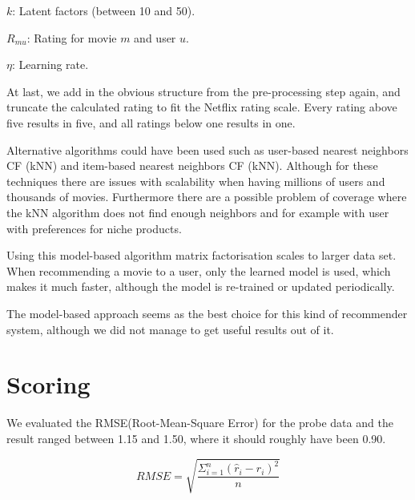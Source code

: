 	\begin{description}
		\item $k$: Latent factors (between 10 and 50).
		\item $R_{mu}$: Rating for movie $m$ and user $u$.
		\item $\eta$: Learning rate.
	\end{description}
	
	At last, we add in the obvious structure from the pre-processing step again, and truncate the calculated rating to fit the Netflix rating scale. Every rating above five results in five, and all ratings below one results in one.
	
	Alternative algorithms could have been used such as user-based nearest neighbors CF (kNN) and item-based nearest neighbors CF (kNN). Although for these techniques there are issues with scalability when having millions of users and thousands of movies. Furthermore there are a possible problem of coverage where the kNN algorithm does not find enough neighbors and for example with user with preferences for niche products.
	
	Using this model-based algorithm matrix factorisation scales to larger data set. When recommending a movie to a user, only the learned model is used, which makes it much faster, although the model is re-trained or updated periodically.
	
	The model-based approach seems as the best choice for this kind of recommender system, although we did not manage to get useful results out of it.
	
	\section{Scoring}
	We evaluated the RMSE(Root-Mean-Square Error) for the probe data and the result ranged between 1.15 and 1.50, where it should roughly have been 0.90.
	
	$$RMSE = \sqrt{\frac{\Sigma_{i = 1}^{n} (\hat{r}_i - r_i)^2}{n}}$$


